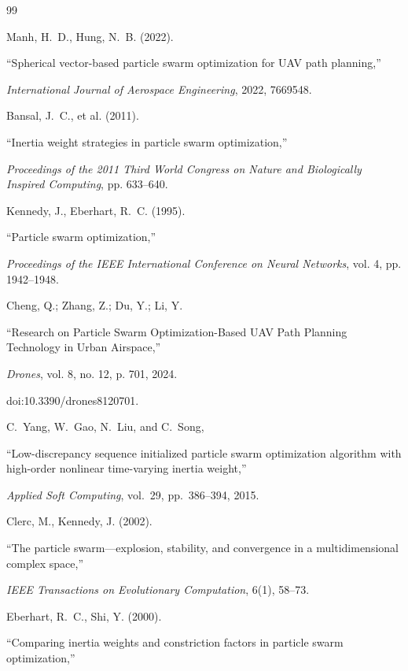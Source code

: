 \documentclass[fleqn,10pt]{wlscirep}
\begin{document}
\begin{thebibliography}{99}

Manh, H.~D., Hung, N.~B. (2022).

``Spherical vector-based particle swarm optimization for UAV path planning,''

\textit{International Journal of Aerospace Engineering}, 2022, 7669548.


Bansal, J.~C., et al. (2011).

``Inertia weight strategies in particle swarm optimization,''

\textit{Proceedings of the 2011 Third World Congress on Nature and Biologically Inspired Computing}, pp. 633--640.


Kennedy, J., Eberhart, R.~C. (1995).

``Particle swarm optimization,''

\textit{Proceedings of the IEEE International Conference on Neural Networks}, vol. 4, pp. 1942--1948.


Cheng, Q.; Zhang, Z.; Du, Y.; Li, Y.

``Research on Particle Swarm Optimization-Based UAV Path Planning Technology in Urban Airspace,''

\textit{Drones}, vol. 8, no. 12, p. 701, 2024.

doi:10.3390/drones8120701.


C.~Yang, W.~Gao, N.~Liu, and C.~Song,

``Low-discrepancy sequence initialized particle swarm optimization algorithm with high-order nonlinear time-varying inertia weight,''

\textit{Applied Soft Computing}, vol.~29, pp.~386--394, 2015.


Clerc, M., Kennedy, J. (2002).

``The particle swarm---explosion, stability, and convergence in a multidimensional complex space,''

\textit{IEEE Transactions on Evolutionary Computation}, 6(1), 58--73.


Eberhart, R.~C., Shi, Y. (2000).

``Comparing inertia weights and constriction factors in particle swarm optimization,''


\end{thebibliography}
\end{document}
